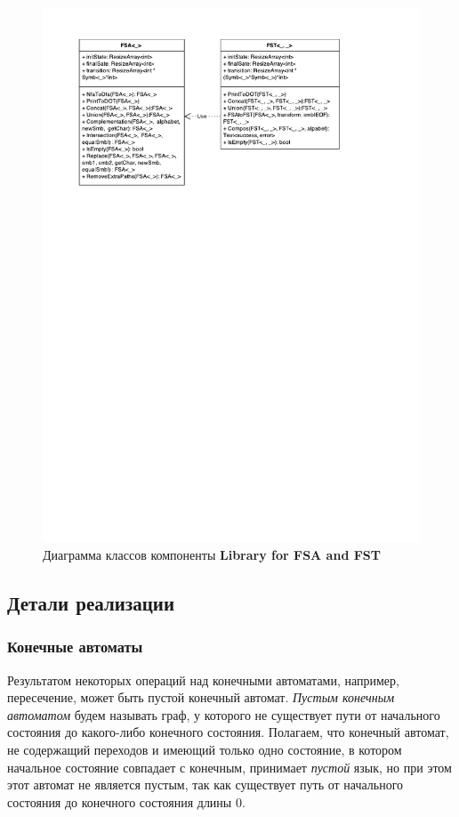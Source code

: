 \documentclass{matmex-diploma}
\begin{document}
\begin{figure}[h!]
\begin{center}
\includegraphics[width=1.0\textwidth]{ClassDiagramLib}
\caption{Диаграмма классов компоненты \textbf{Library for FSA and FST} }
\label{fig:ClassLib} 
\end{center}
\end{figure}


\subsection{Детали реализации}

\subsubsection{Конечные автоматы}

Результатом некоторых операций над конечными автоматами, например, пересечение, может быть пустой конечный автомат. \textit{Пустым конечным автоматом} будем называть граф, у которого не существует пути от начального состояния до какого-либо конечного состояния. Полагаем, что конечный автомат, не содержащий переходов и имеющий только одно состояние, в котором начальное состояние совпадает с конечным, принимает \textit{пустой} язык, но при этом этот автомат не является пустым, так как существует путь от начального состояния до конечного состояния длины 0. 
\end{document}
